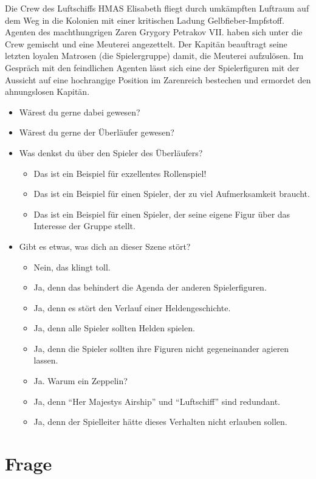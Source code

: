 \documentclass{article}
\newcommand\frage[1]{\section{Frage}\label{#1}}
\begin{document}
Die Crew des Luftschiffs HMAS Elisabeth fliegt durch umkämpften
Luftraum auf dem Weg in die Kolonien mit einer kritischen Ladung
Gelbfieber-Impfstoff. Agenten des machthungrigen Zaren Grygory
Petrakov VII. haben sich unter die Crew gemischt und eine Meuterei
angezettelt. Der Kapitän beauftragt seine letzten loyalen Matrosen
(die Spielergruppe) damit, die Meuterei aufzulösen. Im Gespräch mit
den feindlichen Agenten lässt sich eine der Spielerfiguren mit der
Aussicht auf eine hochrangige Position im Zarenreich bestechen und
ermordet den ahnungslosen Kapitän.
\begin{itemize}
\item  Wärest du gerne dabei gewesen?
\item  Wärest du gerne der Überläufer gewesen?
\item  Was denkst du über den Spieler des Überläufers?
  \begin{itemize}
  \item Das ist ein Beispiel für exzellentes Rollenspiel!
  \item Das ist ein Beispiel für einen Spieler, der zu viel Aufmerksamkeit braucht.
  \item Das ist ein Beispiel für einen Spieler, der seine eigene Figur über das Interesse der Gruppe stellt.
  \end{itemize}
\item  Gibt es etwas, was dich an dieser Szene stört?
  \begin{itemize}
  \item Nein, das klingt toll.
  \item Ja, denn das behindert die Agenda der anderen Spielerfiguren.
  \item Ja, denn es stört den Verlauf einer Heldengeschichte.
  \item Ja, denn alle Spieler sollten Helden spielen.
  \item Ja, denn die Spieler sollten ihre Figuren nicht gegeneinander agieren lassen.
  \item Ja. Warum ein Zeppelin?
  \item Ja, denn ``Her Majestys Airship'' und ``Luftschiff'' sind redundant.
  \item Ja, denn der Spielleiter hätte dieses Verhalten nicht erlauben sollen.
  \end{itemize}
\end{itemize}

\frage{gefaengnis}
\end{document}
